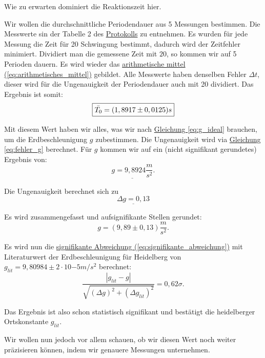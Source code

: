 Wie zu erwarten dominiert die Reaktionszeit hier.

Wir wollen die durchschnittliche Periodendauer aus 5 Messungen bestimmen. Die Messwerte sin der Tabelle 2 des \hyperref[Protokoll]{Protokolls} zu entnehmen. Es wurden für jede Messung die Zeit für 20 Schwingung bestimmt, dadurch wird der Zeitfehler minimiert. Dividiert man die gemessene Zeit mit $20$, so kommen wir auf 5 Perioden dauern. Es wird wieder das \hyperref[eq:arithmetisches_mittel]{arithmetische mittel (\ref*{eq:arithmetisches_mittel})} gebildet. Alle Messwerte haben denselben Fehler $\Delta t$, dieser wird für die Ungenauigkeit der Periodendauer auch mit 20 dividiert. Das Ergebnis ist somit:
\begin{equation}
    \boxed{
        \Bar{T_0} = (1,8917 \pm 0,0125)s
    }
\end{equation}

Mit diesem Wert haben wir alles, was wir nach \hyperref[eq:g_ideal]{Gleichung \ref*{eq:g_ideal}} brauchen, um die Erdbeschleunigung $g$ zubestimmen. Die Ungenauigkeit wird via \hyperref[eq:fehler_g]{Gleichung \ref*{eq:fehler_g}} berechnet.
Für $g$ kommen wir auf ein (nicht signifikant gerundetes) Ergebnis von:
\begin{equation}
    \underline{
        g = 9,8924 \frac{m}{s^2}
    }.
\end{equation}

Die Ungenauigkeit berechnet sich zu
\begin{equation}
    \underline{
        \Delta g = 0,13
    }
\end{equation}


Es wird zusammengefasst und aufsignifikante Stellen gerundet:
\begin{equation}
\boxed{
    g  = ( 9,89 \pm 0,13) \frac{m}{s^2}
}.
\end{equation}

Es wird nun die \hyperref[eq:signifikante_abweichung]{signifikante Abweichung (\ref*{eq:signifikante_abweichung})} mit Literaturwert der Erdbeschleunigung für Heidelberg von $g_{lit} = 9,80984 \pm 2 \cdot 10{-5} m/s^2$ berechnet:
\begin{equation}
    \frac{\left| g_{lit} - g \right|}{\sqrt{(\Delta g)^2 + (\Delta g_{lit})^2}} = 0,62\sigma.
\end{equation}

Das Ergebnis ist also schon statistisch signifikant und bestätigt die heidelberger Ortskonstante $g_{lit}$. 

Wir wollen nun jedoch vor allem schauen, ob wir diesen Wert noch weiter präzisieren können, indem wir genauere Messungen unternehmen.


